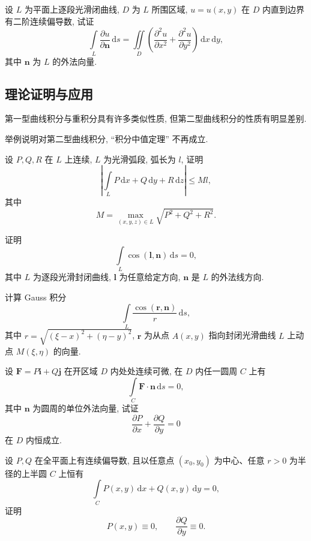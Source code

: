 \documentclass[../数学分析培优讲义.tex]{subfiles}
\begin{document}
\begin{example}
设 $L$ 为平面上逐段光滑闭曲线, $D$ 为 $L$ 所围区域, $u=u(x,y)$ 在 $D$ 内直到边界有二阶连续偏导数, 试证
\[
    \int\limits_L\dfrac{\partial u}{\partial\bm n}\,\mathrm{d}s
    =\iint\limits_D\left(\dfrac{\partial^2u}{\partial x^2}+\dfrac{\partial^2u}{\partial y^2}\right)\,\mathrm{d}x\,\mathrm{d}y,
\]
其中 $\bm n$ 为 $L$ 的外法向量.
\end{example}
\exampleblank


\newpage

\subsection{理论证明与应用}

第一型曲线积分与重积分具有许多类似性质, 但第二型曲线积分的性质有明显差别.

\begin{example}
举例说明对第二型曲线积分, ``积分中值定理'' 不再成立.
\end{example}
\exampleblank

\begin{example}
设 $P,Q,R$ 在 $L$ 上连续, $L$ 为光滑弧段, 弧长为 $l$, 证明
\[
    \left|\int\limits_LP\,\mathrm{d}x+Q\,\mathrm{d}y+R\,\mathrm{d}z\right|\leq Ml,
\]
其中
\[
    M=\max_{(x,y,z)\in L}\sqrt{P^2+Q^2+R^2}.
\]
\end{example}
\exampleblank

\begin{example}
证明
\[
    \int\limits_L\cos(\bm l,\bm n)\,\mathrm{d}s=0,
\]
其中 $L$ 为逐段光滑封闭曲线, $\bm l$ 为任意给定方向, $\bm n$ 是 $L$ 的外法线方向.
\end{example}
\exampleblank

\begin{example}
计算 Gauss 积分
\[
    \int\limits_L\dfrac{\cos(\bm r,\bm n)}{r}\,\mathrm{d}s,
\]
其中 $r=\sqrt{(\xi-x)^2+(\eta-y)^2}$, $\bm r$ 为从点 $A(x,y)$ 指向封闭光滑曲线 $L$ 上动点 $M(\xi,\eta)$ 的向量.
\end{example}
\exampleblank

\begin{example}[\markstar]
设 $\bm F=P\bm i+Q\bm j$ 在开区域 $D$ 内处处连续可微, 在 $D$ 内任一圆周 $C$ 上有
\[
    \int\limits_C\bm F\cdot\bm n\,\mathrm{d}s=0,
\]
其中 $\bm n$ 为圆周的单位外法向量, 试证
\[
    \dfrac{\partial P}{\partial x}+\dfrac{\partial Q}{\partial y}=0
\]
在 $D$ 内恒成立.
\end{example}
\exampleblank

\begin{example}[\markstar]
设 $P,Q$ 在全平面上有连续偏导数, 且以任意点 $(x_0,y_0)$ 为中心、任意 $r>0$ 为半径的上半圆 $C$ 上恒有
\[
    \int\limits_C P(x,y)\,\mathrm{d}x+Q(x,y)\,\mathrm{d}y=0,
\]
证明
\[
    P(x,y)\equiv0,
    \qquad
    \dfrac{\partial Q}{\partial y}\equiv0.
\]
\end{example}
\exampleblank
\end{document}
